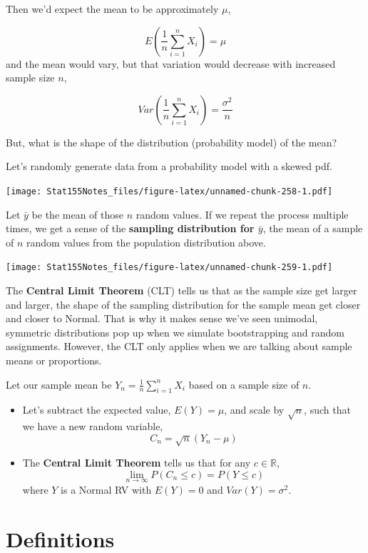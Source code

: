 \documentclass[]{book}
\begin{document}
Then we'd expect the mean to be approximately \(\mu\),

\[E(\frac{1}{n}\sum_{i=1}^n X_i) = \mu\]
and the mean would vary, but that variation would decrease with increased sample size \(n\),

\[Var(\frac{1}{n}\sum_{i=1}^n X_i) = \frac{\sigma^2}{n}\]

But, what is the shape of the distribution (probability model) of the mean?

Let's randomly generate data from a probability model with a skewed pdf.

\texttt{[image: Stat155Notes\_files/figure-latex/unnamed-chunk-258-1.pdf]}

Let \(\bar{y}\) be the mean of those \(n\) random values. If we repeat the process multiple times, we get a sense of the \textbf{sampling distribution for \(\bar{y}\)}, the mean of a sample of \(n\) random values from the population distribution above.

\texttt{[image: Stat155Notes\_files/figure-latex/unnamed-chunk-259-1.pdf]}

The \textbf{Central Limit Theorem} (CLT) tells us that as the sample size get larger and larger, the shape of the sampling distribution for the sample mean get closer and closer to Normal. That is why it makes sense we've seen unimodal, symmetric distributions pop up when we simulate bootstrapping and random assignments. However, the CLT only applies when we are talking about sample means or proportions.

Let our sample mean be \(Y_n = \frac{1}{n}\sum_{i=1}^n X_i\) based on a sample size of \(n\).

\begin{itemize}
\item
  Let's subtract the expected value, \(E(Y) = \mu\), and scale by \(\sqrt{n}\), such that we have a new random variable,
  \[C_n = \sqrt{n}\left(Y_n - \mu\right) \]
\item
  The \textbf{Central Limit Theorem} tells us that for any \(c \in \mathbb{R}\),
  \[\lim_{n\rightarrow\infty}P(C_n \leq c) = P(Y \leq c)\]
  where \(Y\) is a Normal RV with \(E(Y) = 0\) and \(Var(Y) = \sigma^2\).
\end{itemize}

\hypertarget{definitions}{%
\chapter{Definitions}\label{definitions}}
\end{document}
